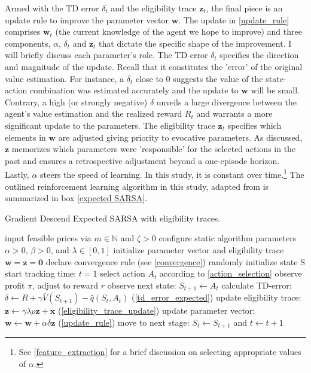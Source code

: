 Armed with the TD error $\delta_t$ and the eligibility trace $\boldsymbol{z}_t$, the final piece is an update rule to improve the parameter vector $\boldsymbol{w}$. The update in \autoref{update_rule} comprises $\boldsymbol{w}_t$  (the current knowledge of the agent we hope to improve) and three components, $\alpha$, $\delta_t$ and $\boldsymbol{z}_t$ that dictate the specific shape of the improvement. I will briefly discuss each parameter's role. The TD error $\delta_t$ specifies the direction and magnitude of the update. Recall that it constitutes the 'error' of the original value estimation. For instance, a $\delta_t$ close to 0 suggests the value of the state-action combination was estimated accurately and the update to $\boldsymbol{w}$ will be small. Contrary, a high (or strongly negative) $\delta$ unveils a large divergence between the agent's value estimation and the realized reward $R_t$ and warrants a more significant update to the parameters. The eligibility trace $\boldsymbol{z}_t$ specifies which elements in $\boldsymbol{w}$ are adjusted giving priority to evocative parameters. As discussed, $\boldsymbol{z}$ memorizes which parameters were 'responsible' for the selected actions in the past and ensures a retrospective adjustment beyond a one-episode horizon. Lastly, $\alpha$ steers the speed of learning. In this study, it is constant over time.\footnote{See \autoref{feature_extraction} for a brief discussion on selecting appropriate values of $\alpha$.} The outlined reinforcement learning algorithm in this study, adapted from \textcite{sutton_reinforcement_2018} is summarized in box \autoref{expected SARSA}.

\begin{algorithm}
	\caption{Gradient Descend Expected SARSA with eligibility traces.}
	\begin{algorithmic}[testing]
		\label{expected SARSA}
		\small
		\STATE input feasible prices via $m \in \mathbb{N}$ and $\zeta > 0$
		\STATE configure static algorithm parameters $\alpha > 0$, $\beta > 0$, and $\lambda \in [0, 1]$
		\STATE initialize parameter vector and eligibility trace $\boldsymbol{w} = \boldsymbol{z} = \boldsymbol{0}$
		\STATE declare convergence rule (see \autoref{convergence})
		\STATE randomly initialize state S
		\STATE start tracking time: $t = 1$
		\STATE select action $A_t$ according to \autoref{action_selection}
		\STATE observe profit $\pi$, adjust to reward $r$
		\STATE observe next state: $S_{t+1} \leftarrow A_t$
		\STATE calculate TD-error: $\delta \leftarrow R +  \gamma \bar{V}(S_{t+1}) - \hat{q}(S_t, A_t)$ (\autoref{td_error_expected})
		\STATE update eligibility trace: $\boldsymbol{z} \leftarrow \gamma \lambda \rho \boldsymbol{z} + \boldsymbol{x} $ (\autoref{eligibility_trace_update})
		\STATE update parameter vector: $\boldsymbol{w} \leftarrow \boldsymbol{w} + \alpha  \delta  \boldsymbol{z}$ (\autoref{update_rule})
		\STATE move to next stage: $S_t \leftarrow S_{t+1}$ and $t \leftarrow t+1$
		\ENDWHILE
	\end{algorithmic}
\end{algorithm}

